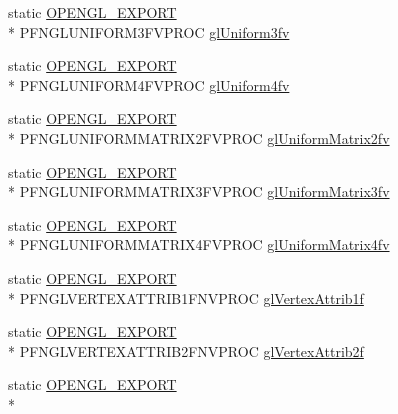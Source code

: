 \begin{DoxyCompactItemize}
\item 
static \hyperlink{_config_8h_a77401aa3bc0a379879047c1bd30f262e}{O\+P\+E\+N\+G\+L\+\_\+\+E\+X\+P\+O\+R\+T} \\*
P\+F\+N\+G\+L\+U\+N\+I\+F\+O\+R\+M3\+F\+V\+P\+R\+O\+C \hyperlink{class_agmd_1_1_g_l_driver_a3cec96e3d8b35ce79b0354c73e374ab4}{gl\+Uniform3fv}
\item 
static \hyperlink{_config_8h_a77401aa3bc0a379879047c1bd30f262e}{O\+P\+E\+N\+G\+L\+\_\+\+E\+X\+P\+O\+R\+T} \\*
P\+F\+N\+G\+L\+U\+N\+I\+F\+O\+R\+M4\+F\+V\+P\+R\+O\+C \hyperlink{class_agmd_1_1_g_l_driver_a65384d11fa265e7717b5c251d7eec00b}{gl\+Uniform4fv}
\item 
static \hyperlink{_config_8h_a77401aa3bc0a379879047c1bd30f262e}{O\+P\+E\+N\+G\+L\+\_\+\+E\+X\+P\+O\+R\+T} \\*
P\+F\+N\+G\+L\+U\+N\+I\+F\+O\+R\+M\+M\+A\+T\+R\+I\+X2\+F\+V\+P\+R\+O\+C \hyperlink{class_agmd_1_1_g_l_driver_a209ee0ba14551740f5dc4ba6448f5437}{gl\+Uniform\+Matrix2fv}
\item 
static \hyperlink{_config_8h_a77401aa3bc0a379879047c1bd30f262e}{O\+P\+E\+N\+G\+L\+\_\+\+E\+X\+P\+O\+R\+T} \\*
P\+F\+N\+G\+L\+U\+N\+I\+F\+O\+R\+M\+M\+A\+T\+R\+I\+X3\+F\+V\+P\+R\+O\+C \hyperlink{class_agmd_1_1_g_l_driver_ab3423707830a770ec584d245c99409ae}{gl\+Uniform\+Matrix3fv}
\item 
static \hyperlink{_config_8h_a77401aa3bc0a379879047c1bd30f262e}{O\+P\+E\+N\+G\+L\+\_\+\+E\+X\+P\+O\+R\+T} \\*
P\+F\+N\+G\+L\+U\+N\+I\+F\+O\+R\+M\+M\+A\+T\+R\+I\+X4\+F\+V\+P\+R\+O\+C \hyperlink{class_agmd_1_1_g_l_driver_a84dd6e63b9895fa975d5e3ade98586d7}{gl\+Uniform\+Matrix4fv}
\item 
static \hyperlink{_config_8h_a77401aa3bc0a379879047c1bd30f262e}{O\+P\+E\+N\+G\+L\+\_\+\+E\+X\+P\+O\+R\+T} \\*
P\+F\+N\+G\+L\+V\+E\+R\+T\+E\+X\+A\+T\+T\+R\+I\+B1\+F\+N\+V\+P\+R\+O\+C \hyperlink{class_agmd_1_1_g_l_driver_af65e9dcb352536e6311f7b23c4357cd9}{gl\+Vertex\+Attrib1f}
\item 
static \hyperlink{_config_8h_a77401aa3bc0a379879047c1bd30f262e}{O\+P\+E\+N\+G\+L\+\_\+\+E\+X\+P\+O\+R\+T} \\*
P\+F\+N\+G\+L\+V\+E\+R\+T\+E\+X\+A\+T\+T\+R\+I\+B2\+F\+N\+V\+P\+R\+O\+C \hyperlink{class_agmd_1_1_g_l_driver_a1bbb9035294023bb58f1663fd4ecf11e}{gl\+Vertex\+Attrib2f}
\item 
static \hyperlink{_config_8h_a77401aa3bc0a379879047c1bd30f262e}{O\+P\+E\+N\+G\+L\+\_\+\+E\+X\+P\+O\+R\+T} \\*

\end{DoxyCompactItemize}
